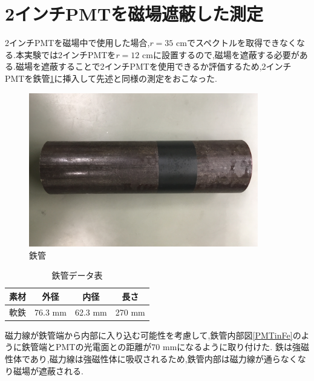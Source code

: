 \section{2インチPMTを磁場遮蔽した測定}
2インチPMTを磁場中で使用した場合,$r=35$ cmでスペクトルを取得できなくなる.本実験では2インチPMTを$r=12$ cmに設置するので,磁場を遮蔽する必要がある.磁場を遮蔽することで2インチPMTを使用できるか評価するため,2インチPMTを鉄管\ref{ironpipe}に挿入して先述と同様の測定をおこなった.
\begin{figure}[tbp]
	\centering
		\includegraphics[width=10cm]{fig/iguchi/ironpipe.JPG}
	\caption{鉄管}
	\label{ironpipe}
\end{figure}

\begin{table}[tbp]
	\centering
	 \begin{tabular}{cccc} \hline
		素材 & 外径 & 内径 & 長さ \\ \hline \hline
		軟鉄 & 76.3 mm & 62.3 mm & 270 mm \\ \hline
	\end{tabular}
	  \caption{鉄管データ表}
	  \label{ironpipedata}
\end{table}

磁力線が鉄管端から内部に入り込む可能性を考慮して,鉄管内部図\ref{PMTinFe}のように鉄管端とPMTの光電面との距離が70 mmになるように取り付けた.
鉄は強磁性体であり,磁力線は強磁性体に吸収されるため,鉄管内部は磁力線が通らなくなり磁場が遮蔽される.

